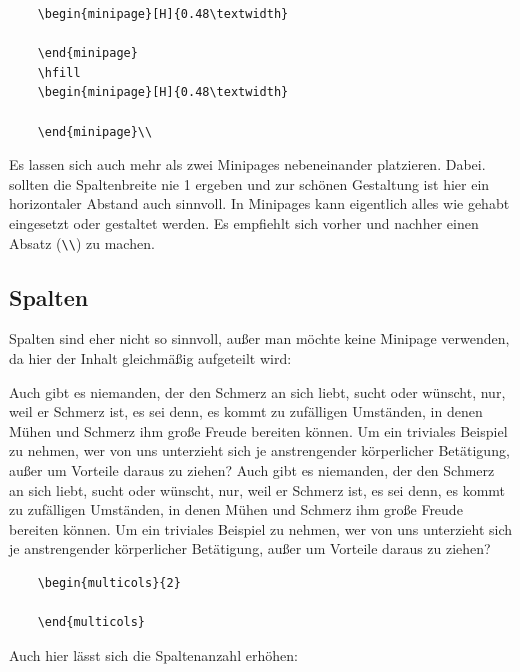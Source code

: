 \begin{verbatim}
    \begin{minipage}[H]{0.48\textwidth}
    	
    \end{minipage}
    \hfill
    \begin{minipage}[H]{0.48\textwidth}
    	
    \end{minipage}\\
\end{verbatim}

Es lassen sich auch mehr als zwei Minipages nebeneinander platzieren. Dabei. sollten die Spaltenbreite nie 1 ergeben und zur schönen Gestaltung ist hier ein horizontaler Abstand auch sinnvoll. In Minipages kann eigentlich alles wie gehabt eingesetzt oder gestaltet werden. Es empfiehlt sich vorher und nachher einen Absatz (\verb|\\|) zu machen.


\subsection{Spalten}

Spalten sind eher nicht so sinnvoll, außer man möchte keine Minipage verwenden, da hier der Inhalt gleichmäßig aufgeteilt wird:

\begin{multicols}{2}
	Auch gibt es niemanden, der den Schmerz an sich liebt, sucht oder wünscht, nur, weil er Schmerz ist, es sei denn, es kommt zu zufälligen Umständen, in denen Mühen und Schmerz ihm große Freude bereiten können. Um ein triviales Beispiel zu nehmen, wer von uns unterzieht sich je anstrengender körperlicher Betätigung, außer um Vorteile daraus zu ziehen? Auch gibt es niemanden, der den Schmerz an sich liebt, sucht oder wünscht, nur, weil er Schmerz ist, es sei denn, es kommt zu zufälligen Umständen, in denen Mühen und Schmerz ihm große Freude bereiten können. Um ein triviales Beispiel zu nehmen, wer von uns unterzieht sich je anstrengender körperlicher Betätigung, außer um Vorteile daraus zu ziehen?
\end{multicols}

\begin{verbatim}
    \begin{multicols}{2}
    	
    \end{multicols}
\end{verbatim}

Auch hier lässt sich die Spaltenanzahl erhöhen:

